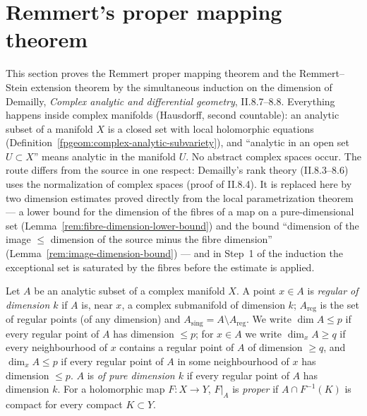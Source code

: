 \section{Remmert's proper mapping theorem}
\label{sec:remmert}

This section proves the Remmert proper mapping theorem and the Remmert--Stein extension theorem by the
simultaneous induction on the dimension of Demailly, \emph{Complex analytic and differential geometry}, II.8.7--8.8.
Everything happens inside complex manifolds (Hausdorff, second countable): an analytic subset of a manifold
\(X\) is a closed set with local holomorphic equations (Definition~\ref{fpgeom:complex-analytic-subvariety}),
and ``analytic in an open set \(U\subset X\)'' means analytic in the manifold \(U\). No abstract complex spaces occur.
The route differs from the source in one respect: Demailly's rank theory (II.8.3--8.6) uses the normalization of
complex spaces (proof of II.8.4). It is replaced here by two dimension estimates proved directly from the local
parametrization theorem --- a lower bound for the dimension of the fibres of a map on a pure-dimensional set
(Lemma~\ref{rem:fibre-dimension-lower-bound}) and the bound ``dimension of the image \(\le\) dimension of the source
minus the fibre dimension'' (Lemma~\ref{rem:image-dimension-bound}) --- and in Step~1 of the induction the
exceptional set is saturated by the fibres before the estimate is applied.

\begin{definition}
\label{rem:dimension}
\leanok
Let \(A\) be an analytic subset of a complex manifold \(X\). A point \(x\in A\) is \emph{regular of dimension \(k\)} if \(A\) is, near \(x\), a
complex submanifold of dimension \(k\); \(A_{\mathrm{reg}}\) is the set of regular points (of any dimension) and \(A_{\mathrm{sing}}=A\setminus A_{\mathrm{reg}}\).
We write \(\dim A\le p\) if every regular point of \(A\) has dimension \(\le p\); for \(x\in A\) we write \(\dim_xA\ge q\) if every neighbourhood of
\(x\) contains a regular point of \(A\) of dimension \(\ge q\), and \(\dim_xA\le p\) if every regular point of \(A\) in some neighbourhood of \(x\) has dimension \(\le p\).
\(A\) is \emph{of pure dimension \(k\)} if every regular point of \(A\) has dimension \(k\).
For a holomorphic map \(F\colon X\to Y\), \(F|_A\) is \emph{proper} if \(A\cap F^{-1}(K)\) is compact for every compact \(K\subset Y\).
\end{definition}

